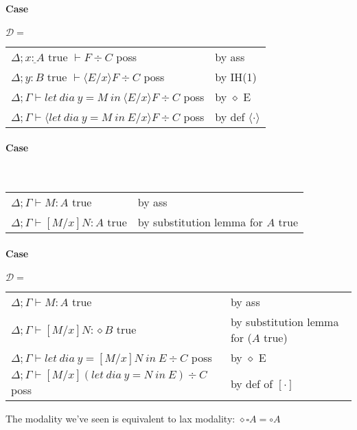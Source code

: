 \documentclass[12 pt]{article}
\begin{document}
    \paragraph{Case} $\mathcal{D} =$
    \noLine
    \noLine
    \DP
    \\
    \begin{tabular}{l l}
      $\Delta; \underline{x : A}$ true $\vdash F \div C$ poss& by ass
      \\ $\Delta; y : B$ true $\vdash \langle E/x \rangle F \div C$ poss & by IH(1)
      \\ $\Delta; \Gamma \vdash let\ dia\ y = M\ in\ \langle E/x \rangle F \div C$ poss & by $\diamond$ E
      \\ $\Delta; \Gamma \vdash \langle let\ dia\ y = M\ in\ E/x \rangle F \div C$ poss & by def $\langle \cdot \rangle$
    \end{tabular}
    \paragraph{Case}
    \noLine
    \DP
    \\
    \begin{tabular}{l l}
      $\Delta; \Gamma \vdash M : A$ true& by ass
      \\ $\Delta; \Gamma \vdash [M/x]N : A$ true & by substitution lemma for $A$ true
    \end{tabular}
    \paragraph{Case} $\mathcal{D} =$
    \noLine
    \noLine
    \DP
    \\
    \begin{tabular}{l l}
      $\Delta; \Gamma \vdash M : A$ true & by ass
      \\ $\Delta; \Gamma \vdash [M/x]N: \diamond B$ true & by substitution lemma for ($A$ true)
      \\ $\Delta; \Gamma \vdash let\ dia\ y = [M/x]N\ in\ E \div C$ poss & by $\diamond$ E
      \\ $\Delta; \Gamma \vdash [M/x](let\ dia\ y = N\ in\ E) \div C$ poss & by def of $[\cdot]$
    \end{tabular}

    The modality we've seen is equivalent to lax modality: $\diamond
    \square A = \circ A$
\end{document}
